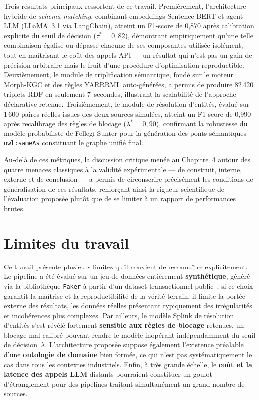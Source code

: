 Trois résultats principaux ressortent de ce travail. Premièrement,
l'architecture hybride de \textit{schema matching}, combinant
embeddings Sentence-BERT et agent LLM (LLaMA~3.1 via LangChain),
atteint un F1-score de 0,870 après calibration explicite du seuil de
décision ($\tau^{*} = 0{,}82$), démontrant empiriquement qu'une telle
combinaison égalise ou dépasse chacune de ses composantes utilisée
isolément, tout en maîtrisant le coût des appels API — un résultat
qui n'est pas un gain de précision arbitraire mais le fruit d'une
procédure d'optimisation reproductible. Deuxièmement, le module de
triplification sémantique, fondé sur le moteur Morph-KGC et des
règles YARRRML auto-générées, a permis de produire 82\,420 triplets
RDF en seulement 7~secondes, illustrant la scalabilité de l'approche
déclarative retenue. Troisièmement, le module de résolution
d'entités, évalué sur 1\,600 paires réelles issues des deux sources
simulées, atteint un F1-score de 0,990 après recalibrage des règles
de blocage ($\lambda^{*} = 0{,}90$), confirmant la robustesse du
modèle probabiliste de Fellegi-Sunter pour la génération des ponts
sémantiques \texttt{owl:sameAs} constituant le graphe unifié final.

Au-delà de ces métriques, la discussion critique menée au
Chapitre~4 autour des quatre menaces classiques à la validité
expérimentale — de construit, interne, externe et de conclusion — a
permis de circonscrire précisément les conditions de généralisation
de ces résultats, renforçant ainsi la rigueur scientifique de
l'évaluation proposée plutôt que de se limiter à un rapport de
performances brutes.

\section*{Limites du travail}

Ce travail présente plusieurs limites qu'il convient de reconnaître
explicitement. Le pipeline a été évalué sur un jeu de données
entièrement \textbf{synthétique}, généré via la bibliothèque
\texttt{Faker} à partir d'un dataset transactionnel public~; si ce
choix garantit la maîtrise et la reproductibilité de la vérité
terrain, il limite la portée externe des résultats, les données
réelles présentant typiquement des irrégularités et incohérences
plus complexes. Par ailleurs, le modèle Splink de résolution
d'entités s'est révélé fortement \textbf{sensible aux règles de
blocage} retenues, un blocage mal calibré pouvant rendre le modèle
inopérant indépendamment du seuil de décision~$\lambda$. L'architecture
proposée suppose également l'existence préalable d'une
\textbf{ontologie de domaine} bien formée, ce qui n'est pas
systématiquement le cas dans tous les contextes industriels. Enfin,
à très grande échelle, le \textbf{coût et la latence des appels LLM}
distants pourraient constituer un goulot d'étranglement pour des
pipelines traitant simultanément un grand nombre de sources.

